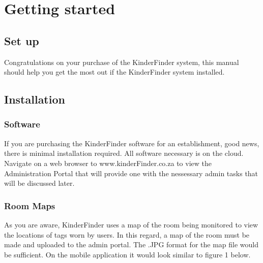 \documentclass{article}
\begin{document}
\newpage

\section{Getting started}
\subsection{Set up}
Congratulations on your purchase of the KinderFinder system, this manual should help you get the most out if the KinderFinder system installed.

\subsection{Installation}
\subsubsection{Software}
If you are purchasing the KinderFinder software for an establishment, good news, there is minimal installation required.
All software necessary is on the cloud. Navigate on a web browser to www.kinderFinder.co.za to view the Administration Portal that will provide one with the nessessary admin tasks that will be discussed later.

\subsubsection{Room Maps}
As you are aware, KinderFinder uses a map of the room being monitored to view the locations of tags worn by users. In this regard, a map of the room must be made and uploaded to the admin portal. The .JPG format for the map file would be sufficient. On the mobile application it would look similar to figure 1 below.
\end{document}
